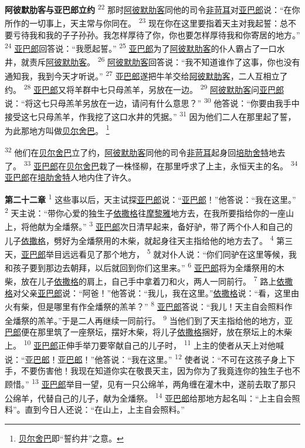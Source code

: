 \textbf{阿彼默肋客与亚巴郎立约\quad}
\textsuperscript{22}
那时\uline{阿彼默}\uline{肋客}同他的司令\uline{非苛耳}对\uline{亚巴郎}说：“在你所作的一切事上，天主常与你同在。
\textsuperscript{23}
现在你在这里要指着天主对我起誓：总不要亏待我和我的子子孙孙。我怎样厚待了你，你也要怎样厚待我和你寄居的地方。”
\textsuperscript{24}
\uline{亚巴郎}回答说：“我愿起誓。”
\textsuperscript{25}
\uline{亚巴郎}为了\uline{阿彼默}\uline{肋客}的仆人霸占了一口水井，就责斥\uline{阿彼默}\uline{肋客}。
\textsuperscript{26}
\uline{阿彼默}\uline{肋客}回答说：“我不知道谁作了这事，你也没有通知我，我到今天才听说。”
\textsuperscript{27}
\uline{亚巴郎}遂把牛羊交给\uline{阿彼默}\uline{肋客}，二人互相立了约。
\textsuperscript{28}
\uline{亚巴郎}又将羊群中七只母羔羊，另放在一边。
\textsuperscript{29}
\uline{阿彼默}\uline{肋客}问\uline{亚巴郎}说：“将这七只母羔羊另放在一边，请问有什么意思？”
\textsuperscript{30}
他答说：“你要由我手中接受这七只母羔羊，作我挖了这口水井的凭据。”
\textsuperscript{31}
因为他们二人在那里起了誓，为此那地方叫做\uline{贝尔}\uline{舍巴}。
\footnote{\uline{贝尔}\uline{舍巴}即“誓约井”之意。}

\textsuperscript{32}
他们在\uline{贝尔}\uline{舍巴}立了约，\uline{阿彼默}\uline{肋客}同他的司令\uline{非苛耳}起身回\uline{培肋}\uline{舍特}地去了。
\textsuperscript{33}
\uline{亚巴郎}在\uline{贝尔}\uline{舍巴}栽了一株怪柳，在那里呼求了上主，永恒天主的名。
\textsuperscript{34}
\uline{亚巴郎}在\uline{培肋}\uline{舍特}人地内住了许久。

\textbf{第二十二章\quad}
\textsuperscript{1}
这些事以后，天主试探\uline{亚巴郎}说：“\uline{亚巴郎}！”他答说：“我在这里。”
\textsuperscript{2}
天主说：“带你心爱的独生子\uline{依撒格}往\uline{摩黎雅}地方去，在我所要指给你的一座山上，将他献为全燔祭。”
\textsuperscript{3}
\uline{亚巴郎}次日清早起来，备好驴，带了两个仆人和自己的儿子\uline{依撒格}，劈好为全燔祭用的木柴，就起身往天主指给他的地方去了。
\textsuperscript{4}
第三天，\uline{亚巴郎}举目远远看见了那个地方，
\textsuperscript{5}
就对仆人说：“你们同驴在这里等候，我和孩子要到那边去朝拜，以后就回到你们这里来。”
\textsuperscript{6}
\uline{亚巴郎}将为全燔祭用的木柴，放在儿子\uline{依撒格}的肩上，自己手中拿着刀和火，两人一同前行。
\textsuperscript{7}
路上\uline{依撒格}对父亲\uline{亚巴郎}说：“阿爸！”他答说：“我儿，我在这里。”\uline{依撒格}说：“看，这里由火有柴，但是哪里有作全燔祭的羔羊？”
\textsuperscript{8}
\uline{亚巴郎}答说：“我儿！天主自会照料作全燔祭的羔羊。”于是二人再继续一同前行。
\textsuperscript{9}
当他们到了天主指给他的地方，\uline{亚巴郎}便在那里筑了一座祭坛，摆好木柴，将儿子\uline{依撒格}捆好，放在祭坛上的木柴上。
\textsuperscript{10}
\uline{亚巴郎}正伸手举刀要宰献自己的儿子时，
\textsuperscript{11}
上主的使者从天上对他喊说：“\uline{亚巴郎}！\uline{亚巴郎}！”他答说：“我在这里。”
\textsuperscript{12}
使者说：“不可在这孩子身上下手，不要伤害他！我现在知道你实在敬畏天主，因为你为了我竟连你的独生子也不顾惜。”
\textsuperscript{13}
\uline{亚巴郎}举目一望，见有一只公绵羊，两角缠在灌木中，遂前去取了那只公绵羊，代替自己的儿子，献为全燔祭。
\textsuperscript{14}
\uline{亚巴郎}给那地方起名叫：“上主自会照料”。直到今日人还说：“在山上，上主自会照料。”

